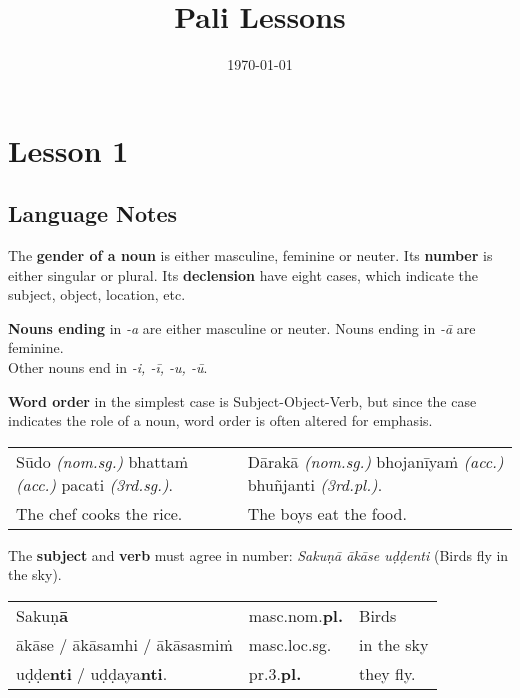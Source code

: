 \documentclass[11pt,oneside]{memoir}
\date{\today}
\title{Pali Lessons}
\begin{document}
\maketitle

\chapter{Lesson 1}
\label{sec:org685bcf4}
\section{Language Notes}
\label{sec:org21ea422}

The \textbf{gender of a noun} is either masculine, feminine or neuter.
Its \textbf{number} is either singular or plural.
Its \textbf{declension} have eight cases, which indicate the subject, object, location, etc.

\textbf{Nouns ending} in \emph{-a} are either masculine or neuter. Nouns ending in \emph{-ā} are feminine.\\[0pt]
Other nouns end in \emph{-i, -ī, -u, -ū}.

\textbf{Word order} in the simplest case is Subject-Object-Verb, but since the case indicates the role of a noun, word order is often altered for emphasis.

\begin{center}
\begin{tabular}{ll}
Sūdo \emph{(nom.sg.)} bhattaṁ \emph{(acc.)} pacati \emph{(3rd.sg.)}. & Dārakā \emph{(nom.sg.)} bhojanīyaṁ \emph{(acc.)} bhuñjanti \emph{(3rd.pl.)}.\\[0pt]
The chef cooks the rice. & The boys eat the food.\\[0pt]
\end{tabular}
\end{center}

The \textbf{subject} and \textbf{verb} must agree in number: \emph{Sakuṇā ākāse uḍḍenti} (Birds fly in the sky).

\begin{center}
\begin{tabular}{lll}
Sakuṇ\textbf{ā} & masc.nom.\textbf{pl.} & Birds\\[0pt]
ākāse / ākāsamhi / ākāsasmiṁ & masc.loc.sg. & in the sky\\[0pt]
uḍḍe\textbf{nti} / uḍḍaya\textbf{nti}. & pr.3.\textbf{pl.} & they fly.\\[0pt]
\end{tabular}
\end{center}
\end{document}
